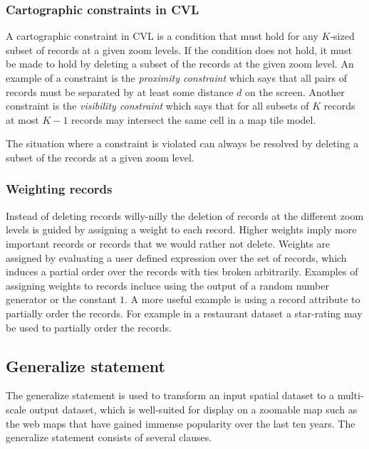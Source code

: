 \subsubsection{Cartographic constraints in CVL}

A cartographic constraint in CVL is a condition that must hold for any $K$-sized subset of records at a given zoom levels. If the condition does not hold, it must be made to hold by deleting a subset of the records at the given zoom level. An example of a constraint is the \emph{proximity constraint} which says that all pairs of records must be separated by at least some distance $d$ on the screen. Another constraint is the \emph{visibility constraint} which says that for all subsets of $K$ records at most $K-1$ records may intersect the same cell in a map tile model.

The situation where a constraint is violated can always be resolved by deleting a subset of the records at a given zoom level.

\subsubsection{Weighting records}
Instead of deleting records willy-nilly the deletion of records at the different zoom levels is guided by assigning a weight to each record. Higher weights imply more important records or records that we would rather not delete. Weights are assigned by evaluating a user defined expression over the set of records, which induces a partial order over the records with ties broken arbitrarily. Examples of assigning weights to records incluce using the output of a random number generator or the constant $1$. A more useful example is using a record attribute to partially order the records. For example in a restaurant dataset a star-rating may be used to partially order the records.


\subsection{Generalize statement}
The generalize statement is used to transform an input spatial dataset to a multi-scale output dataset, which is well-suited for display on a zoomable map such as the web maps that have gained immense popularity over the last ten years. The generalize statement consists of several clauses. 

